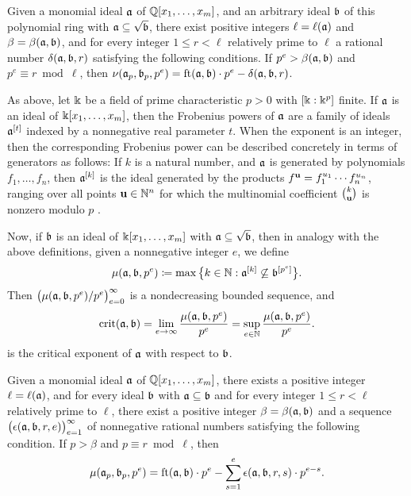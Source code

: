 \documentclass[11pt]{amsart}
\begin{document}
%
\begin{theorem}
   \label{general-nu-theorem: T}
   Given a monomial ideal $\mathfrak{a}$ of $\mathbb{Q}[x_1, \ldots, x_m]$, and an arbitrary ideal $\mathfrak{b}$ of this polynomial ring with $\mathfrak{a} \subseteq \sqrt{\mathfrak{b}}$, there exist positive integers $\ell = \ell(\mathfrak{a})$ and  $\beta = \beta(\mathfrak{a}, \mathfrak{b})$, and for every integer $1 \leq r < \ell$ relatively prime to $\ell$ a rational number $\delta(\mathfrak{a}, \mathfrak{b}, r)$ satisfying the following conditions.
   If $p^e > \beta(\mathfrak{a}, \mathfrak{b})$ and $p^e \equiv r \bmod \ell$, then $ \nu(\mathfrak{a}_p, \mathfrak{b}_p, p^e) = \operatorname{ft}(\mathfrak{a}, \mathfrak{b}) \cdot p^e - \delta(\mathfrak{a}, \mathfrak{b}, r)$.
\end{theorem}

As above, let $\Bbbk$ be a field of prime characteristic $p>0$ with $[\Bbbk: \Bbbk^p]$ finite.
If $\mathfrak{a}$ is an ideal of $\Bbbk[x_1, \ldots, x_m]$, then the Frobenius powers of $\mathfrak{a}$ are a family of ideals $\mathfrak{a}^{[t]}$ indexed by a nonnegative real parameter $t$.
When the exponent is an integer, then the corresponding Frobenius power can be described concretely in terms of generators as follows:
If $k$ is a natural number, and $\mathfrak{a}$ is generated by polynomials $f_1, \ldots, f_n$, then $\mathfrak{a}^{[k]}$ is the ideal generated by the products $f^{\mathbf{u}} = f_1^{u_1}\cdots f_n^{u_n}$, ranging over all points $\mathbf{u} \in \mathbb{N}^n$ for which the multinomial coefficient $\binom{k}{\mathbf{u}}$ is nonzero modulo $p$  \cite[Proposition~3.5]{hernandez+etal.frobenius_powers}.

Now, if $\mathfrak{b}$ is an ideal of $\Bbbk[x_1, \ldots, x_m]$ with $\mathfrak{a} \subseteq \sqrt{\mathfrak{b}}$, then in analogy with the above definitions, given a nonnegative integer $e$, we define
\[\mu(\mathfrak{a},\mathfrak{b},p^e) \coloneqq \max\big\{k\in \mathbb{N} : \mathfrak{a}^{[k]} \not\subseteq \mathfrak{b}^{[p^e]}\big\}.\]
Then $\big(\mu(\mathfrak{a},\mathfrak{b},p^e)/p^e\big)_{e=0}^{\infty}$ is a nondecreasing bounded sequence, and
\begin{equation}\label{eq: crit as a limit of mus}
   \operatorname{crit}(\mathfrak{a},\mathfrak{b}) = \lim_{e\to \infty} \frac{\mu(\mathfrak{a},\mathfrak{b},p^e)}{p^e} = \sup_{e\in \mathbb{N}} \frac{\mu(\mathfrak{a},\mathfrak{b},p^e)}{p^e}.
\end{equation}
is the critical exponent of $\mathfrak{a}$ with respect to $\mathfrak{b}$.

\begin{theorem}
   \label{general-mu-theorem: T}
   Given a monomial ideal $\mathfrak{a}$ of $\mathbb{Q}[x_1, \ldots, x_m]$, there exists a positive integer $\ell = \ell(\mathfrak{a})$, and for every ideal $\mathfrak{b}$ with $\mathfrak{a} \subseteq {\mathfrak{b}}$ and for every integer $1 \leq r < \ell$ relatively prime to $\ell$, there exist a positive integer $\beta = \beta(\mathfrak{a}, \mathfrak{b})$ and a sequence $\big(\epsilon(\mathfrak{a}, \mathfrak{b}, r, e)\big)_{e=1}^{\infty}$ of nonnegative rational numbers satisfying the following condition.
   If $p > \beta$ and $p \equiv r \bmod \ell$, then
   \[ \mu(\mathfrak{a}_p, \mathfrak{b}_p, p^e) = \operatorname{ft}(\mathfrak{a}, \mathfrak{b}) \cdot p^e - \sum_{s=1}^{e} \epsilon(\mathfrak{a}, \mathfrak{b}, r, s) \cdot p^{e-s}.\]
\end{theorem}
\end{document}
